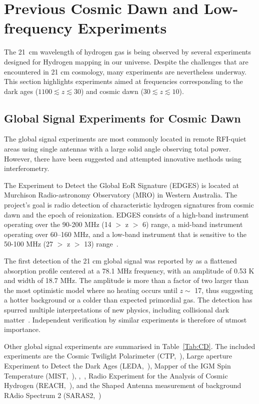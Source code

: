 \section{Previous Cosmic Dawn and Low-frequency Experiments}

The \SI{21}{cm} wavelength of hydrogen gas is being observed by several experiments designed for Hydrogen mapping in our universe. Despite the challenges that are encountered in 21 cm cosmology, many experiments are nevertheless underway. This section highlights experiments aimed at frequencies corresponding to the dark ages ($1100 \lesssim z \lesssim 30$) and cosmic dawn ($30 \lesssim z \lesssim 10$).

\subsection{Global Signal Experiments for Cosmic Dawn}

The global signal experiments are most commonly located in remote RFI-quiet areas using single antennas with a large solid angle observing total power. However, there have been suggested and attempted innovative methods using interferometry. 

The Experiment to Detect the Global EoR Signature (EDGES) is located at Murchison Radio-astronomy Observatory (MRO) in Western Australia. The project's goal is radio detection of characteristic hydrogen signatures from cosmic dawn and the epoch of reionization. EDGES consists of a high-band instrument operating over the 90-200 MHz (14 $>$ z $>$ 6) range, a mid-band instrument operating over 60–160 MHz, and a low-band instrument that is sensitive to the 50-100 MHz (27 $>$ z $>$ 13) range~\citep{2017ApJ...835...49M}. 

The first detection of the 21 cm global signal was reported by \citet{2018Natur.555...67B} as a flattened absorption profile centered at a 78.1 MHz frequency, with an amplitude of 0.53 K and width of 18.7 MHz. The amplitude is more than a factor of two larger than the most optimistic model where no heating occurs until $z \sim$ 17, thus suggesting a hotter background or a colder than expected primordial gas. The detection has spurred multiple interpretations of new physics, including collisional dark matter~\citep{2018Natur.555...71B, PhysRevD.98.103005}. Independent verification by similar experiments is therefore of utmost importance.

Other global signal experiments are summarised in Table~\ref{Tab:CD}. The included experiments are the Cosmic Twilight Polarimeter (CTP,~\citet{2019ApJ...883..126N}),  Large aperture Experiment to Detect the Dark Ages (LEDA,~\citet{2012JAI.....150004T, 2018MNRAS.478.4193P}), Mapper of the IGM Spin Temperature (MIST,~\citet{inproceedings}),   \prizm,~\citet{2019JAI.....850004P}, Radio Experiment for the Analysis of Cosmic Hydrogen (REACH,~\citet{8879199}), and the Shaped Antenna measurement of background RAdio Spectrum 2 (SARAS2,~\citet{2013ExA....36..319P})  

